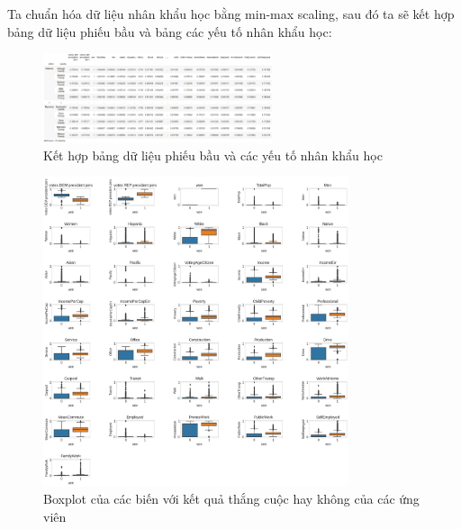 \documentclass[14pt, a4paper]{article}
\numberwithin{equation}{section}
\numberwithin{figure}{section}
\numberwithin{dl}{section}
\numberwithin{md}{section}
\numberwithin{bd}{section}
\numberwithin{dn}{section}
\numberwithin{hq}{section}
\begin{document}
    Ta chuẩn hóa dữ liệu nhân khẩu học bằng min-max scaling, sau đó ta sẽ kết hợp bảng dữ liệu phiếu bầu và bảng các yếu tố nhân khẩu học:

    \begin{figure}[h!]
        \centering
        \includegraphics[width=0.6\textwidth]{figures/President_Normalized_Demographic_Merged_Dataframe.png}
        \caption{Kết hợp bảng dữ liệu phiếu bầu và các yếu tố nhân khẩu học}
    \end{figure}

    \begin{figure}[h!]
        \centering
        \includegraphics[width=0.8\textwidth]{figures/Box_plot.png}
        \caption{Boxplot của các biến với kết quả thắng cuộc hay không của các ứng viên}
    \end{figure}
\end{document}
